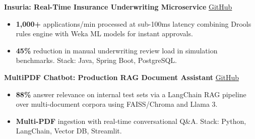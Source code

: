 \documentclass[10pt,letterpaper]{article}
\begin{document}
\noindent \textbf{Insuria: Real-Time Insurance Underwriting Microservice} \hfill \href{https://github.com/jimitchavdadev/Insuria}{GitHub}\par
\begin{itemize}
  \item \textbf{1,000+} applications/min processed at sub-100ms latency combining Drools rules engine with Weka ML models for instant approvals.
  \item \textbf{45\%} reduction in manual underwriting review load in simulation benchmarks. Stack: Java, Spring Boot, PostgreSQL.
\end{itemize}

\noindent \textbf{MultiPDF Chatbot: Production RAG Document Assistant} \hfill \href{https://github.com/jimitchavdadev/MultiPDF_Chatbot}{GitHub}\par
\begin{itemize}
  \item \textbf{88\%} answer relevance on internal test sets via a LangChain RAG pipeline over multi-document corpora using FAISS/Chroma and Llama 3.
  \item \textbf{Multi-PDF} ingestion with real-time conversational Q\&A. Stack: Python, LangChain, Vector DB, Streamlit.
\end{itemize}
\end{document}

